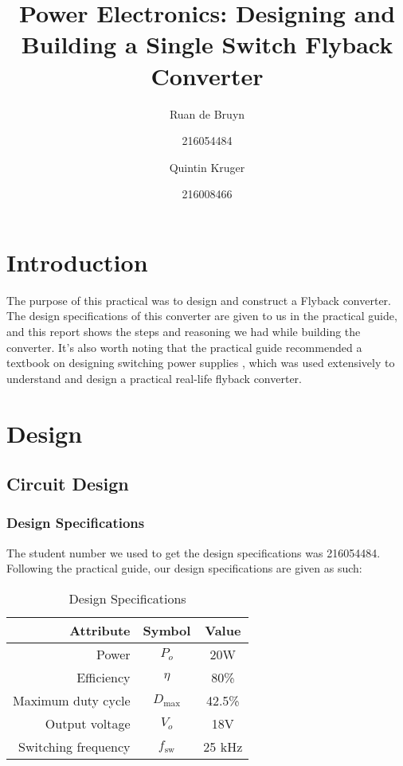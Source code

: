 \documentclass[a4paper, 12pt]{article}
\title{Power Electronics: Designing and Building a Single Switch Flyback Converter}
\author{Ruan de Bruyn \and 216054484 \and Quintin Kruger \and 216008466}
\begin{document}
\maketitle
\newpage
{}
\tableofcontents
\listoffigures
\newpage
{}

\section{Introduction}

The purpose of this practical was to design and construct a Flyback converter.
The design specifications of this converter are given to us in the practical
guide, and this report shows the steps and reasoning we had while building the
converter. It's also worth noting that the practical guide recommended a
textbook on designing switching power supplies \cite{pressman}, which was used
extensively to understand and design a practical real-life flyback converter.


\section{Design}

\subsection{Circuit Design}

\subsubsection{Design Specifications}

The student number we used to get the design specifications was 216054484. Following the practical guide, our design specifications are given as such:

\begin{table}[H]
  \centering
  \begin{tabular}{r c c}
    \toprule
    \textbf{Attribute} & \textbf{Symbol} & \textbf{Value} \\
    \midrule
    Power & $P_o$ & 20W \\
    Efficiency & $\eta$ & 80\% \\
    Maximum duty cycle & $D_{\text{max}}$ & 42.5\% \\
    Output voltage & $V_o$ & 18V \\
    Switching frequency & $f_{\text{sw}}$ & 25 kHz \\
    \bottomrule
  \end{tabular}
  \caption{Design Specifications}
  \label{tab:design_specs}
\end{table}
\end{document}
